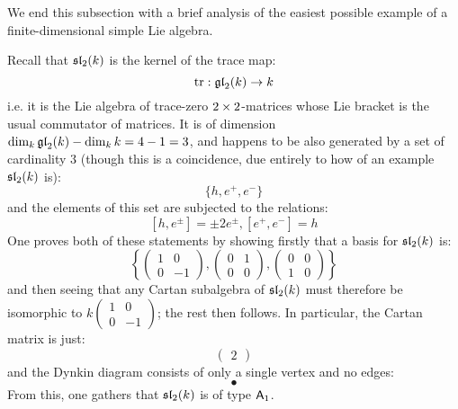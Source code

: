         We end this subsection with a brief analysis of the easiest possible example of a finite-dimensional simple Lie algebra. 
        \begin{example}[$\sl_2$]
            Recall that $\sl_2(k)$ is the kernel of the trace map:
                $$\trace: \gl_2(k) \to k$$
            i.e. it is the Lie algebra of trace-zero $2 \x 2$-matrices whose Lie bracket is the usual commutator of matrices. It is of dimension $\dim_k \gl_2(k) - \dim_k k = 4 - 1 = 3$, and happens to be also generated by a set of cardinality $3$ (though this is a coincidence, due entirely to how  of an example $\sl_2(k)$ is):
                $$\{h, e^+, e^-\}$$
            and the elements of this set are subjected to the relations:
                $$[h, e^{\pm}] = \pm 2 e^{\pm}, [e^+, e^-] = h$$
            One proves both of these statements by showing firstly that a basis for $\sl_2(k)$ is:
                $$\left\{ \begin{pmatrix} 1 & 0 \\ 0 & -1 \end{pmatrix}, \begin{pmatrix} 0 & 1 \\ 0 & 0 \end{pmatrix}, \begin{pmatrix} 0 & 0 \\ 1 & 0 \end{pmatrix} \right\}$$
            and then seeing that any Cartan subalgebra of $\sl_2(k)$ must therefore be isomorphic to $k \begin{pmatrix} 1 & 0 \\ 0 & -1 \end{pmatrix}$; the rest then follows. In particular, the Cartan matrix is just:
                $$\begin{pmatrix} 2 \end{pmatrix}$$
            and the Dynkin diagram consists of only a single vertex and no edges:
                $$\bullet$$
            From this, one gathers that $\sl_2(k)$ is of type $\sfA_1$. 
        \end{example}

